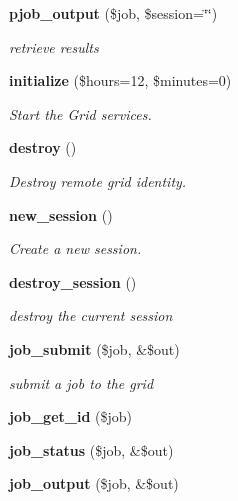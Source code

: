 \begin{CompactItemize}
{\bf pjob\_\-output} (\$job, \$session=\char`\"{}\char`\"{})
\begin{CompactList}\small\item\em retrieve results \item\end{CompactList}\item 
{\bf initialize} (\$hours=12, \$minutes=0)
\begin{CompactList}\small\item\em Start the Grid services. \item\end{CompactList}\item 
{\bf destroy} ()
\begin{CompactList}\small\item\em Destroy remote grid identity. \item\end{CompactList}\item 
{\bf new\_\-session} ()
\begin{CompactList}\small\item\em Create a new session. \item\end{CompactList}\item 
{\bf destroy\_\-session} ()
\begin{CompactList}\small\item\em destroy the current session \item\end{CompactList}\item 
{\bf job\_\-submit} (\$job, \&\$out)
\begin{CompactList}\small\item\em submit a job to the grid \item\end{CompactList}\item 
{\bf job\_\-get\_\-id} (\$job)
\item 
{\bf job\_\-status} (\$job, \&\$out)
\item 
{\bf job\_\-output} (\$job, \&\$out)
\end{CompactItemize}
